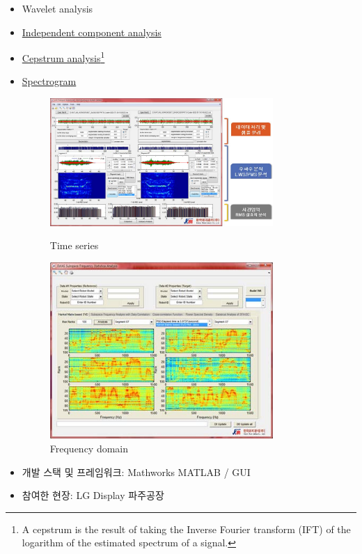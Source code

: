 \begin{itemize}[label=]
\begin{itemize}
		      \item Wavelet analysis
		      \item \href{https://en.wikipedia.org/wiki/Independent_component_analysis}{Independent component analysis}
		      \item \href{https://en.wikipedia.org/wiki/Cepstrum}{Cepstrum analysis}\footnote{A cepstrum is the result of taking the Inverse Fourier transform (IFT) of the logarithm of the estimated spectrum of a signal.}
		      \item \href{https://en.wikipedia.org/wiki/Spectrogram}{Spectrogram}
		            \begin{figure}[ht]
			            \begin{fullwidth}
				            \parbox{0.8\textwidth}{
					            \includegraphics[width=0.8\textwidth]{images/lgdisplay.jpg}
					            \caption*{Time series}
				            }\qquad
				            \parbox{0.8\textwidth}{
					            \includegraphics[width=0.8\textwidth]{images/lgdisplay_02.jpg}
					            \caption*{Frequency domain}
				            }
			            \end{fullwidth}
		            \end{figure}
		      \item 개발 스택 및 프레임워크: Mathworks MATLAB / GUI
		      \item 참여한 현장: LG Display 파주공장
	      \end{itemize}
\end{itemize}

